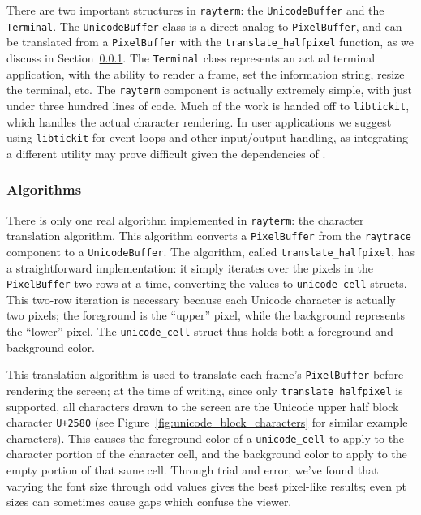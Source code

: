 There are two important structures in \texttt{rayterm}: the \texttt{UnicodeBuffer} and the \texttt{Terminal}.
The \texttt{UnicodeBuffer} class is a direct analog to \texttt{PixelBuffer},
and can be translated from a \texttt{PixelBuffer} with the \texttt{translate\_halfpixel} function, as we discuss in Section~\ref{ch:methods:interface:tickit:algorithms}.
The \texttt{Terminal} class represents an actual terminal application, with the ability to render a frame, set the information string, resize the terminal, etc.
The \texttt{rayterm} component is actually extremely simple, with just under three hundred lines of code.
Much of the work is handed off to \texttt{libtickit}, which handles the actual character rendering.
In user applications we suggest using \texttt{libtickit} for event loops and other input/output handling, as integrating a different utility may prove difficult given the dependencies of \name{}.

\subsubsection{Algorithms}
\label{ch:methods:interface:tickit:algorithms}

There is only one real algorithm implemented in \texttt{rayterm}: the character translation algorithm.
This algorithm converts a \texttt{PixelBuffer} from the \texttt{raytrace} component to a \texttt{UnicodeBuffer}.
The algorithm, called \texttt{translate\_halfpixel}, has a straightforward implementation: it simply iterates over the pixels in the \texttt{PixelBuffer} two rows at a time, converting the values to \texttt{unicode\_cell} structs.
This two-row iteration is necessary because each Unicode character is actually two pixels; the foreground is the ``upper'' pixel, while the background represents the ``lower'' pixel.
The \texttt{unicode\_cell} struct thus holds both a foreground and background color.

This translation algorithm is used to translate each frame's \texttt{PixelBuffer} before rendering the screen; at the time of writing, since only \texttt{translate\_halfpixel} is supported, all characters drawn to the screen are the Unicode upper half block character \texttt{U+2580} (see Figure~\ref{fig:unicode_block_characters} for similar example characters).
This causes the foreground color of a \texttt{unicode\_cell} to apply to the character portion of the character cell, and the background color to apply to the empty portion of that same cell.
Through trial and error, we've found that varying the font size through odd values gives the best pixel-like results; even pt sizes can sometimes cause gaps which confuse the viewer.

